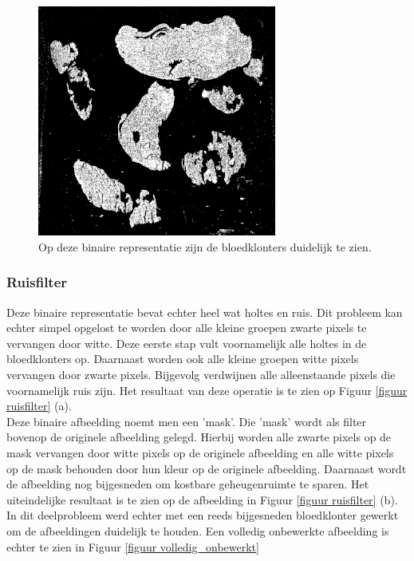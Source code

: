\documentclass[a4paper,kulak]{kulakarticle}
\begin{document}
\begin{figure}[H]
	\centering
	\includegraphics[width=0.7\textwidth]{grijswaarden_bin_vb}
	\caption{Op deze binaire representatie zijn de bloedklonters duidelijk te zien.}
	\label{figuur foto_bin}
\end{figure}

\subsubsection{Ruisfilter}
Deze binaire representatie bevat echter heel wat holtes en ruis. Dit probleem kan echter simpel opgelost te worden door alle kleine groepen zwarte pixels te vervangen door witte. Deze eerste stap vult voornamelijk alle holtes in de bloedklonters op. Daarnaast worden ook alle kleine groepen witte pixels vervangen door zwarte pixels. Bijgevolg verdwijnen alle alleenstaande pixels die voornamelijk ruis zijn. Het resultaat van deze operatie is te zien op Figuur \ref{figuur ruisfilter} (a). \\
Deze binaire afbeelding noemt men een 'mask'. Die 'mask' wordt als filter bovenop de originele afbeelding gelegd. Hierbij worden alle zwarte pixels op de mask vervangen door witte pixels op de originele afbeelding en alle witte pixels op de mask behouden door hun kleur op de originele afbeelding. Daarnaast wordt de afbeelding nog bijgesneden om kostbare geheugenruimte te sparen. Het uiteindelijke resultaat is te zien op de afbeelding in Figuur \ref{figuur ruisfilter} (b). In dit deelprobleem werd echter met een reeds bijgesneden bloedklonter gewerkt om de afbeeldingen duidelijk te houden. Een volledig onbewerkte afbeelding is echter te zien in Figuur \ref{figuur volledig_onbewerkt}
\end{document}

